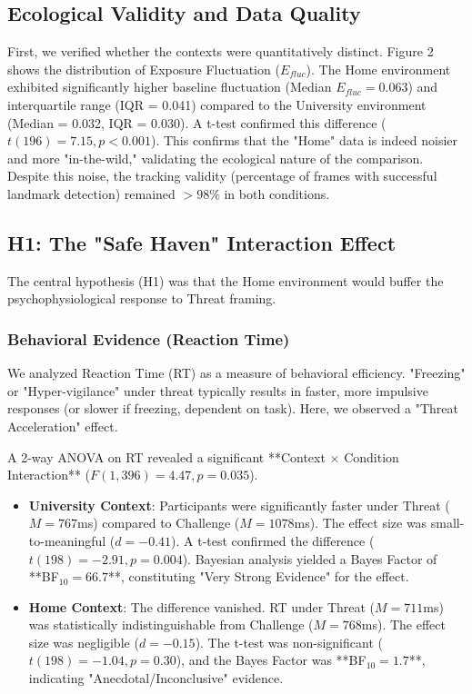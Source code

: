 \documentclass[journal]{IEEEtran}
\begin{document}
\subsection{Ecological Validity and Data Quality}
First, we verified whether the contexts were quantitatively distinct. Figure 2 shows the distribution of Exposure Fluctuation ($E_{fluc}$). The Home environment exhibited significantly higher baseline fluctuation (Median $E_{fluc} = 0.063$) and interquartile range (IQR = 0.041) compared to the University environment (Median = 0.032, IQR = 0.030). A t-test confirmed this difference ($t(196) = 7.15, p < 0.001$). This confirms that the "Home" data is indeed noisier and more "in-the-wild," validating the ecological nature of the comparison. Despite this noise, the tracking validity (percentage of frames with successful landmark detection) remained $>98\%$ in both conditions.

\subsection{H1: The "Safe Haven" Interaction Effect}

The central hypothesis (H1) was that the Home environment would buffer the psychophysiological response to Threat framing. 

\subsubsection{Behavioral Evidence (Reaction Time)}
We analyzed Reaction Time (RT) as a measure of behavioral efficiency. "Freezing" or "Hyper-vigilance" under threat typically results in faster, more impulsive responses (or slower if freezing, dependent on task). Here, we observed a "Threat Acceleration" effect.

A 2-way ANOVA on RT revealed a significant **Context $\times$ Condition Interaction** ($F(1,396) = 4.47, p = 0.035$).

\begin{itemize}
    \item \textbf{University Context}: Participants were significantly faster under Threat ($M=767$ms) compared to Challenge ($M=1078$ms). The effect size was small-to-meaningful ($d = -0.41$). A t-test confirmed the difference ($t(198) = -2.91, p = 0.004$). Bayesian analysis yielded a Bayes Factor of **BF$_{10} = 66.7$**, constituting "Very Strong Evidence" for the effect.
    \item \textbf{Home Context}: The difference vanished. RT under Threat ($M=711$ms) was statistically indistinguishable from Challenge ($M=768$ms). The effect size was negligible ($d = -0.15$). The t-test was non-significant ($t(198) = -1.04, p = 0.30$), and the Bayes Factor was **BF$_{10} = 1.7$**, indicating "Anecdotal/Inconclusive" evidence.
\end{itemize}
\end{document}
